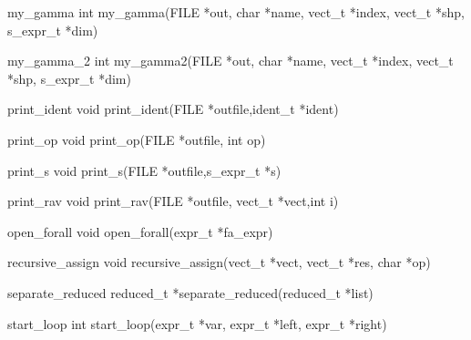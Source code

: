 my_gamma
  int my_gamma(FILE *out, char *name, vect_t *index, vect_t *shp,
    s_expr_t *dim)

my_gamma_2
  int my_gamma2(FILE *out, char *name, vect_t *index, vect_t *shp,
    s_expr_t *dim)

print_ident
  void print_ident(FILE *outfile,ident_t *ident)

print_op
  void print_op(FILE *outfile, int op)

print_s
  void print_s(FILE *outfile,s_expr_t *s)

print_rav
  void print_rav(FILE *outfile, vect_t *vect,int i)

open_forall
  void open_forall(expr_t *fa_expr)

recursive_assign
  void recursive_assign(vect_t *vect, vect_t *res, char *op)

separate_reduced
  reduced_t *separate_reduced(reduced_t *list)

start_loop
  int start_loop(expr_t *var, expr_t *left, expr_t *right)

